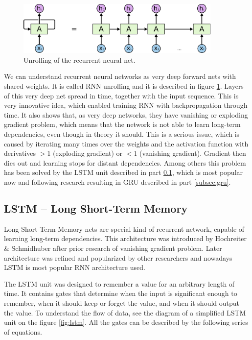 \begin{figure}[!ht]
	\centering
	\includegraphics[width=0.9\textwidth]{fig/RNN-unrolled.png}
	\caption{Unrolling of the recurrent neural net.\cite{colah-lstm}
		\label{fig:rnn-unroll}}
\end{figure}

We can understand recurrent neural networks as very deep forward nets with shared weights. It is called RNN unrolling and it is described in figure \ref{fig:rnn-unroll}. Layers of this very deep net spread in time, together with the input sequence. This is very innovative idea, which enabled training RNN with backpropagation through time. It also shows that, as very deep networks, they have vanishing or exploding gradient problem, which means that the network is not able to learn long-term dependencies, even though in theory it should. This is a serious issue, which is caused by iterating many times over the weights and the activation function with derivatives $>1$ (exploding gradient) or $<1$ (vanishing gradient). Gradient then dies out and learning stops for distant dependencies. Among others this problem has been solved by the LSTM unit described in part \ref{subsec:lstm}, which is most popular now and following research resulting in GRU described in part \ref{subsec:gru}.

		\subsection{LSTM -- Long Short-Term Memory}\label{subsec:lstm}

Long Short-Term Memory nets are special kind of recurrent network, capable of learning long-term dependencies. This architecture was introduced by Hochreiter \& Schmidhuber\cite{Hochreiter:1997:LSM:1246443.1246450} after prior research of vanishing gradient problem\cite{hochreiter1991untersuchungen}. Later architecture was refined and popularized by other researchers\cite{DBLP:conf/ijcnn/GersS00,DBLP:journals/neco/GersSC00} and nowadays LSTM is most popular RNN architecture used.

The LSTM unit was designed to remember a value for an arbitrary length of time. It contains gates that determine when the input is significant enough to remember, when it should keep or forget the value, and when it should output the value. To understand the flow of data, see the diagram of a simplified LSTM unit on the figure \ref{fig:lstm}. All the gates can be described by the following series of equations.

